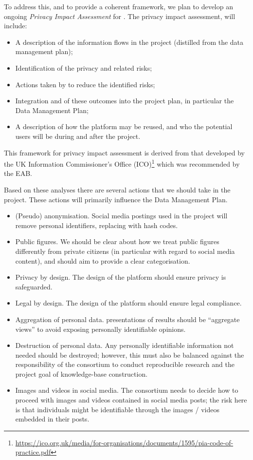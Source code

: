 To address this, and to provide a coherent framework, we plan to develop an ongoing \emph{Privacy Impact Assessment} for \project.  The privacy impact assessment, will include:
\begin{itemize}
    \item A description of the information flows in the project (distilled from the data management plan);
    \item Identification of the privacy and related risks;
    \item Actions taken by \project to reduce the identified risks;
    \item Integration and of these outcomes into the project plan, in particular the Data Management Plan;
    \item A description of how the \project platform may be reused, and who the potential users will be during and after the project.
\end{itemize}
This framework for privacy impact assessment is derived from that developed by the UK Information Commissioner's Office (ICO)\footnote{\url{https://ico.org.uk/media/for-organisations/documents/1595/pia-code-of-practice.pdf}} which was recommended by the EAB.

Based on these analyses there are several actions that we should take in the project.  These actions will primarily influence the Data Management Plan.
\begin{itemize}
    \item (Pseudo) anonymisation.  Social media postings used in the project will remove personal identifiers, replacing with hash codes.
    \item Public figures.  We should be clear about how we treat public figures differently from private citizens (in particular with regard to  social media content), and should aim to provide a clear categorisation.
    \item Privacy by design. The design of the \project platform should ensure privacy is safeguarded.
    \item Legal by design.   The design of the \project platform should ensure legal compliance.
    \item Aggregation of personal data.  \project presentations of results should be ``aggregate views'' to avoid exposing personally identifiable opinions.
    \item Destruction of personal data.  Any personally identifiable information not needed should be destroyed;  however, this must also be balanced against the responsibility of the consortium to conduct reproducible research and the project goal of knowledge-base construction.  
    \item Images and videos in social media.  The consortium needs to decide how to proceed with images and videos contained in social media posts; the risk here is that individuals might be identifiable through the images / videos embedded in their posts.
 \end{itemize}
 
